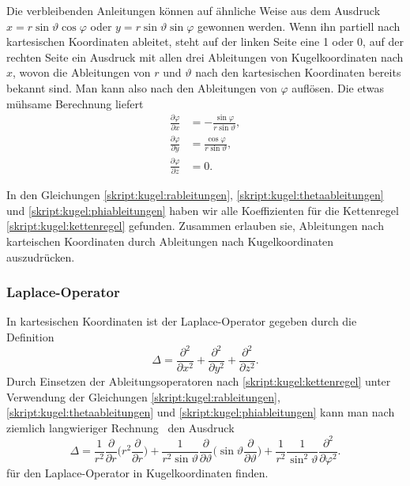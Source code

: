 Die verbleibenden Anleitungen können auf ähnliche Weise aus dem Ausdruck
$x=r\sin\vartheta\cos\varphi$
oder
$y=r\sin\vartheta\sin\varphi$
gewonnen werden.
Wenn ihn partiell nach kartesischen Koordinaten ableitet,
steht auf der linken Seite eine 1 oder 0,
auf der rechten Seite ein Ausdruck mit allen drei Ableitungen von
Kugelkoordinaten nach $x$, wovon die Ableitungen von $r$ und $\vartheta$
nach den kartesischen Koordinaten bereits bekannt sind.
Man kann also nach den Ableitungen von $\varphi$ auflösen.
Die etwas mühsame Berechnung liefert
\begin{equation}
\begin{aligned}
\frac{\partial \varphi}{\partial x}
&=
-\frac{\sin\varphi}{r\sin\vartheta},
\\
\frac{\partial \varphi}{\partial y}
&=
\frac{\cos\varphi}{r\sin\vartheta},
\\
\frac{\partial \varphi}{\partial z}
&=
0.
\end{aligned}
\label{skript:kugel:phiableitungen}
\end{equation}

In den Gleichungen
\eqref{skript:kugel:rableitungen},
\eqref{skript:kugel:thetaableitungen}
und
\eqref{skript:kugel:phiableitungen}
haben wir alle Koeffizienten für die Kettenregel
\eqref{skript:kugel:kettenregel}
gefunden.
Zusammen erlauben sie, Ableitungen nach karteischen Koordinaten
durch Ableitungen nach Kugelkoordinaten auszudrücken.

\subsubsection{Laplace-Operator}
In kartesischen Koordinaten ist der Laplace-Operator gegeben durch die
Definition
\[
\Delta
=
\frac{\partial^2}{\partial x^2}
+
\frac{\partial^2}{\partial y^2}
+
\frac{\partial^2}{\partial z^2}.
\]
Durch Einsetzen der Ableitungsoperatoren nach
\eqref{skript:kugel:kettenregel} unter Verwendung der Gleichungen
\eqref{skript:kugel:rableitungen},
\eqref{skript:kugel:thetaableitungen}
und
\eqref{skript:kugel:phiableitungen}
kann man nach ziemlich langwieriger
Rechnung~\cite[Anhang B.3]{skript:mathsem-qm}
den Ausdruck
\begin{equation}
\Delta
=
\frac1{r^2}\frac{\partial}{\partial r}
\biggl(r^2\frac{\partial}{\partial r}\biggr)
+
\frac{1}{r^2\sin\vartheta}\frac{\partial}{\partial\vartheta}
\biggl(\sin\vartheta\frac{\partial}{\partial\vartheta}\biggr)
+
\frac{1}{r^2}
\frac{1}{\sin^2\vartheta}
\frac{\partial^2}{\partial\varphi^2}.
\end{equation}
für den Laplace-Operator in Kugelkoordinaten finden.
%


